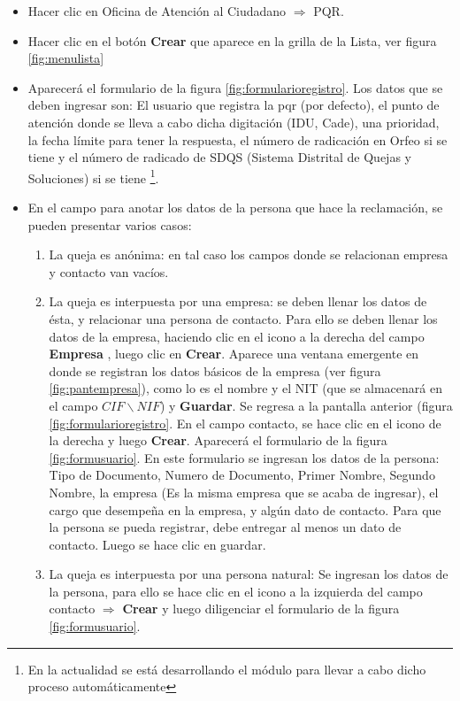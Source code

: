 \begin{itemize}
 \item Hacer clic en Oficina de Atención al Ciudadano $\Rightarrow$ PQR. 
 \item Hacer clic en el botón \textbf{Crear} que aparece en la grilla de la Lista, ver figura \ref{fig:menulista} 
 \item Aparecerá el formulario de la figura \ref{fig:formularioregistro}. Los datos que se deben ingresar son: El usuario que registra 
 la pqr (por defecto), el punto de atención donde se lleva a cabo dicha digitación (IDU, Cade), una prioridad, la fecha límite para tener la respuesta, el número
 de radicación en Orfeo si se tiene y el número de radicado de SDQS (Sistema Distrital de Quejas y Soluciones) si se tiene \footnote{En la actualidad 
 se está desarrollando el módulo para llevar a cabo dicho proceso automáticamente}. 
 \item En el campo para anotar los datos de la persona que hace la reclamación, se pueden presentar varios casos: 
 \begin{enumerate}
  \item La queja es anónima: en tal caso los campos donde se relacionan empresa y contacto van vacíos. 
  \item La queja es interpuesta por una empresa: se deben llenar los datos de ésta, y relacionar una persona de contacto. Para ello se deben llenar 
  los datos de la empresa, haciendo clic en el icono a la derecha del campo 
  \textbf{Empresa} , luego clic en \textbf{Crear}. Aparece una ventana emergente en donde se registran los
  datos básicos de la empresa (ver figura \ref{fig:pantempresa}), como lo es el nombre y el NIT (que se almacenará en el campo $CIF\backslash NIF$) 
  y \textbf{Guardar}. Se regresa a la pantalla anterior (figura \ref{fig:formularioregistro}. 
  En el campo contacto, se hace clic en el icono de la derecha y luego \textbf{Crear}. Aparecerá el formulario de la figura \ref{fig:formusuario}.
  En este formulario se ingresan los datos de la persona: Tipo de Documento, Numero de Documento, Primer Nombre, Segundo Nombre, la 
  empresa (Es la misma empresa que se acaba de ingresar), el cargo que desempeña en la empresa, y algún dato de contacto. Para que la 
  persona se pueda registrar, debe entregar al menos un dato de contacto.  Luego se hace clic en guardar.    
  \item La queja es interpuesta por una persona natural: Se ingresan los datos de la persona, para ello se hace clic en el icono a la izquierda  
  del campo contacto $\Rightarrow$ \textbf{Crear} y luego diligenciar el formulario de la figura \ref{fig:formusuario}.

\end{enumerate}
\end{itemize}
